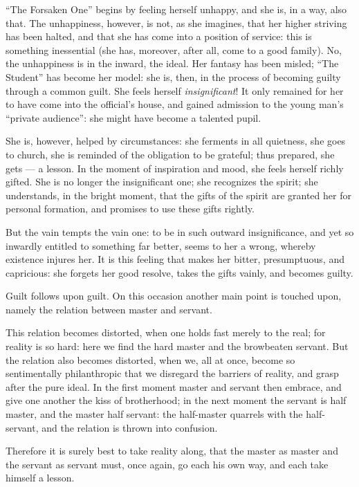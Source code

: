 \documentclass[12pt,a4paper]{book}
\begin{document}
``The Forsaken One'' begins by feeling herself unhappy, and she is, in a way, also that. The unhappiness, however, is not, as she imagines, that her higher striving has been halted, and that she has come into a position of service: this is something inessential (she has, moreover, after all, come to a good family). No, the unhappiness is in the inward, the ideal. Her fantasy has been misled; ``The Student'' has become her model: she is, then, in the process of becoming guilty through a common guilt. She feels herself \emph{insignificant}! It only remained for her to have come into the official's house, and gained admission to the young man's ``private audience'': she might have become a talented pupil.

She is, however, helped by circumstances: she ferments in all quietness, she goes to church, she is reminded of the obligation to be grateful; thus prepared, she gets --- a lesson. In the moment of inspiration and mood, she feels herself richly gifted. She is no longer the insignificant one; she recognizes the spirit; she understands, in the bright moment, that the gifts of the spirit are granted her for personal formation, and promises to use these gifts rightly.

But the vain tempts the vain one: to be in such outward insignificance, and yet so inwardly
entitled to something far better, seems to her a wrong, whereby existence injures her. It is this feeling that makes her bitter, presumptuous, and capricious: she forgets her good resolve, takes the gifts vainly, and becomes guilty.

Guilt follows upon guilt. On this occasion another main point is touched upon, namely the relation between master and servant.

This relation becomes distorted, when one holds fast merely to the real; for reality is so hard: here we find the hard master and the browbeaten servant. But the relation also becomes distorted, when we, all at once, become so sentimentally philanthropic that we disregard the barriers of reality, and grasp after the pure ideal. In the first moment master and servant then embrace, and give one another the kiss of brotherhood; in the next moment the servant is half master, and the master half servant: the half-master quarrels with the half-servant, and the relation is thrown into confusion.

Therefore it is surely best to take reality along, that the master as master and the servant as servant must, once again, go each his own way, and each take himself a lesson.
\end{document}
